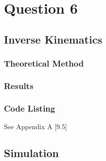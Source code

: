 \newpage
\section{Question 6}
	\subsection{Inverse Kinematics}
	\subsubsection{Theoretical Method}

	
		\subsubsection{Results}

	\subsubsection{Code Listing}
		See Appendix A [9.5]
		
	\subsection{Simulation}


\pagebreak